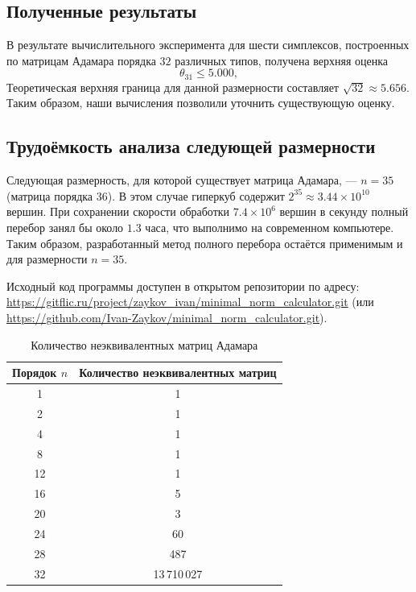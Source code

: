 \documentclass[main]{subfiles}
\begin{document}
\subsection*{Полученные результаты}

В результате вычислительного эксперимента для шести симплексов, построенных по матрицам Адамара порядка $32$ различных типов, получена верхняя оценка
\[
\theta_{31} \le 5.000,
\]
Теоретическая верхняя граница для данной размерности составляет $\sqrt{32} \approx 5.656$. Таким образом, наши вычисления позволили уточнить существующую оценку.

\subsection*{Трудоёмкость анализа следующей размерности}

Следующая размерность, для которой существует матрица Адамара, — $n = 35$ (матрица порядка $36$). В этом случае гиперкуб содержит $2^{35} \approx 3.44 \times 10^{10}$ вершин. При сохранении скорости обработки $7.4 \times 10^6$ вершин в секунду полный перебор занял бы около $1.3$ часа, что выполнимо на современном компьютере. Таким образом, разработанный метод полного перебора остаётся применимым и для размерности $n = 35$.

Исходный код программы доступен в открытом репозитории по адресу:
\url{https://gitflic.ru/project/zaykov_ivan/minimal_norm_calculator.git} (или \url{https://github.com/Ivan-Zaykov/minimal_norm_calculator.git}).


\newpage

\begin{table}[h]
\centering
\caption{Количество неэквивалентных матриц Адамара}
\label{tab:hadamard_counts}
\begin{tabular}{|c|c|}
\hline
\textbf{Порядок $n$} & \textbf{Количество неэквивалентных матриц} \\
\hline
1 & 1 \\
\hline
2 & 1 \\
\hline
4 & 1 \\
\hline
8 & 1 \\
\hline
12 & 1 \\
\hline
16 & 5 \\
\hline
20 & 3 \\
\hline
24 & 60 \\
\hline
28 & 487 \\
\hline
32 & 13\,710\,027 \\
\hline
\end{tabular}
\end{table}
\end{document}
